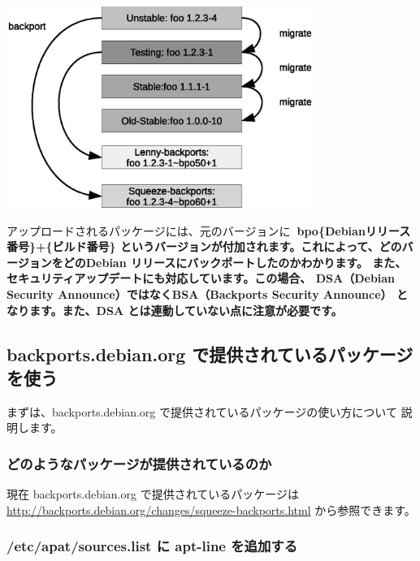 \documentclass[mingoth,a4paper]{jsarticle}
\begin{document}
\begin{center}
\includegraphics[width=10cm]{image201104/backports-image_mono.eps}
\end{center}



アップロードされるパッケージには、元のバージョンに\bf{~{}bpo\{Debianリリース番号\}+\{ビルド番号\}}
というバージョンが付加されます。これによって、どのバージョンをどのDebian
リリースにバックポートしたのかわかります。
また、セキュリティアップデートにも対応しています。この場合、
DSA（Debian Security Announce）ではなくBSA（Backports Security Announce）
となります。また、DSA とは連動していない点に注意が必要です。


\subsection{backports.debian.org で提供されているパッケージを使う}

まずは、backports.debian.org で提供されているパッケージの使い方について
説明します。

\subsubsection{どのようなパッケージが提供されているのか}
現在 backports.debian.org で提供されているパッケージは
\url{http://backports.debian.org/changes/squeeze-backports.html}
から参照できます。

\subsubsection{/etc/apat/sources.list に apt-line を追加する}
\end{document}
